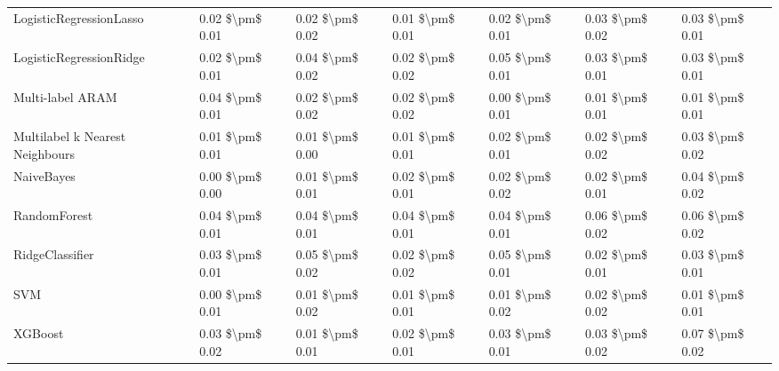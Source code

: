 \begin{tabular}{lllllll}
LogisticRegressionLasso         &  0.02 \$\textbackslash pm\$ 0.01 &           0.02 \$\textbackslash pm\$ 0.02 &       0.01 \$\textbackslash pm\$ 0.01 &        0.02 \$\textbackslash pm\$ 0.01 &                         0.03 \$\textbackslash pm\$ 0.02 &      0.03 \$\textbackslash pm\$ 0.01 \\
LogisticRegressionRidge         &  0.02 \$\textbackslash pm\$ 0.01 &           0.04 \$\textbackslash pm\$ 0.02 &       0.02 \$\textbackslash pm\$ 0.02 &        0.05 \$\textbackslash pm\$ 0.01 &                         0.03 \$\textbackslash pm\$ 0.01 &      0.03 \$\textbackslash pm\$ 0.01 \\
Multi-label ARAM                &  0.04 \$\textbackslash pm\$ 0.01 &           0.02 \$\textbackslash pm\$ 0.02 &       0.02 \$\textbackslash pm\$ 0.02 &        0.00 \$\textbackslash pm\$ 0.01 &                         0.01 \$\textbackslash pm\$ 0.01 &      0.01 \$\textbackslash pm\$ 0.01 \\
Multilabel k Nearest Neighbours &  0.01 \$\textbackslash pm\$ 0.01 &           0.01 \$\textbackslash pm\$ 0.00 &       0.01 \$\textbackslash pm\$ 0.01 &        0.02 \$\textbackslash pm\$ 0.01 &                         0.02 \$\textbackslash pm\$ 0.02 &      0.03 \$\textbackslash pm\$ 0.02 \\
NaiveBayes                      &  0.00 \$\textbackslash pm\$ 0.00 &           0.01 \$\textbackslash pm\$ 0.01 &       0.02 \$\textbackslash pm\$ 0.01 &        0.02 \$\textbackslash pm\$ 0.02 &                         0.02 \$\textbackslash pm\$ 0.01 &      0.04 \$\textbackslash pm\$ 0.02 \\
RandomForest                    &  0.04 \$\textbackslash pm\$ 0.01 &           0.04 \$\textbackslash pm\$ 0.01 &       0.04 \$\textbackslash pm\$ 0.01 &        0.04 \$\textbackslash pm\$ 0.01 &                         0.06 \$\textbackslash pm\$ 0.02 &      0.06 \$\textbackslash pm\$ 0.02 \\
RidgeClassifier                 &  0.03 \$\textbackslash pm\$ 0.01 &           0.05 \$\textbackslash pm\$ 0.02 &       0.02 \$\textbackslash pm\$ 0.02 &        0.05 \$\textbackslash pm\$ 0.01 &                         0.02 \$\textbackslash pm\$ 0.01 &      0.03 \$\textbackslash pm\$ 0.01 \\
SVM                             &  0.00 \$\textbackslash pm\$ 0.01 &           0.01 \$\textbackslash pm\$ 0.02 &       0.01 \$\textbackslash pm\$ 0.01 &        0.01 \$\textbackslash pm\$ 0.02 &                         0.02 \$\textbackslash pm\$ 0.02 &      0.01 \$\textbackslash pm\$ 0.01 \\
XGBoost                         &  0.03 \$\textbackslash pm\$ 0.02 &           0.01 \$\textbackslash pm\$ 0.01 &       0.02 \$\textbackslash pm\$ 0.01 &        0.03 \$\textbackslash pm\$ 0.01 &                         0.03 \$\textbackslash pm\$ 0.02 &      0.07 \$\textbackslash pm\$ 0.02 \\
\bottomrule
\end{tabular}
